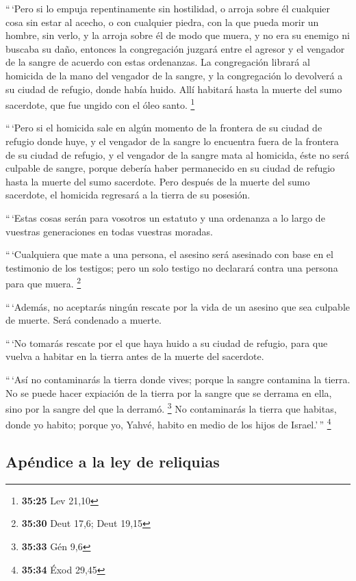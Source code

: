  ``\,`Pero si lo empuja repentinamente sin hostilidad, o
arroja sobre él cualquier cosa sin estar al acecho,  o
con cualquier piedra, con la que pueda morir un hombre, sin verlo, y la
arroja sobre él de modo que muera, y no era su enemigo ni buscaba su
daño,  entonces la congregación juzgará entre el agresor
y el vengador de la sangre de acuerdo con estas ordenanzas.
 La congregación librará al homicida de la mano del
vengador de la sangre, y la congregación lo devolverá a su ciudad de
refugio, donde había huido. Allí habitará hasta la muerte del sumo
sacerdote, que fue ungido con el óleo santo. \footnote{\textbf{35:25}
  Lev 21,10}

 ``\,`Pero si el homicida sale en algún momento de la
frontera de su ciudad de refugio donde huye,  y el
vengador de la sangre lo encuentra fuera de la frontera de su ciudad de
refugio, y el vengador de la sangre mata al homicida, éste no será
culpable de sangre,  porque debería haber permanecido en
su ciudad de refugio hasta la muerte del sumo sacerdote. Pero después de
la muerte del sumo sacerdote, el homicida regresará a la tierra de su
posesión.

 ``\,`Estas cosas serán para vosotros un estatuto y una
ordenanza a lo largo de vuestras generaciones en todas vuestras moradas.

 ``\,`Cualquiera que mate a una persona, el asesino será
asesinado con base en el testimonio de los testigos; pero un solo
testigo no declarará contra una persona para que muera. \footnote{\textbf{35:30}
  Deut 17,6; Deut 19,15}

 ``\,`Además, no aceptarás ningún rescate por la vida de
un asesino que sea culpable de muerte. Será condenado a muerte.

 ``\,`No tomarás rescate por el que haya huido a su
ciudad de refugio, para que vuelva a habitar en la tierra antes de la
muerte del sacerdote.

 ``\,`Así no contaminarás la tierra donde vives; porque
la sangre contamina la tierra. No se puede hacer expiación de la tierra
por la sangre que se derrama en ella, sino por la sangre del que la
derramó. \footnote{\textbf{35:33} Gén 9,6}  No
contaminarás la tierra que habitas, donde yo habito; porque yo, Yahvé,
habito en medio de los hijos de Israel.'\,'' \footnote{\textbf{35:34}
  Éxod 29,45}

\hypertarget{apuxe9ndice-a-la-ley-de-reliquias}{%
\subsection{Apéndice a la ley de
reliquias}\label{apuxe9ndice-a-la-ley-de-reliquias}}

